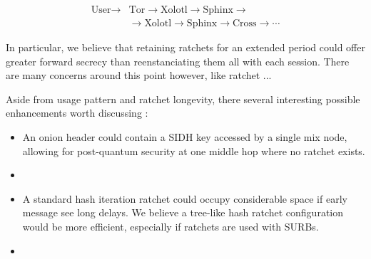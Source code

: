 \documentclass[twoside,letterpaper]{sig-alternate}
\begin{document}
\[ \begin{aligned}
\textrm{User} \to &\textrm{Tor} \to \textrm{Xolotl} \to \textrm{Sphinx} \to \\
\quad &\to \textrm{Xolotl} \to \textrm{Sphinx} \to \textrm{Cross} \to \cdots 
\end{aligned} \]

In particular, we believe that retaining ratchets for an extended period
could offer greater forward secrecy than reenstanciating them all with
each session.  There are many concerns around this point however, like 
ratchet ...

Aside from usage pattern and ratchet longevity,
there several interesting possible enhancements worth discussing : 
\begin{itemize}
\item
An onion header could contain a SIDH key accessed by a single mix node,
allowing for post-quantum security at one middle hop
 where no ratchet exists.
\item

\item 
A standard hash iteration ratchet could occupy considerable space
 if early message see long delays. 
We believe a tree-like hash ratchet configuration would be more efficient,
 especially if ratchets are used with SURBs.
\item

\end{itemize}








\end{document}
